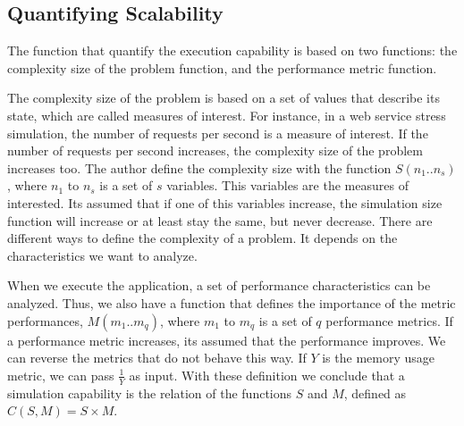 \subsection{Quantifying Scalability}
\label{quantifyingScalability}

The function that quantify the execution capability is based on two functions: the complexity size of the problem function, and the performance metric function. 

The complexity size of the problem is based on a set of values that describe its state, which are called measures of interest. For instance, in a web service stress simulation, the number of requests per second is a measure of interest. If the number of requests per second increases, the complexity size of the problem increases too. The author define the complexity size with the function $S(n_{1}..n_{s})$, where $n_{1}$ to $n_{s}$ is a set of $s$ variables. This variables are the measures of interested. Its assumed that if one of this variables increase, the simulation size function will increase or at least stay the same, but never decrease. There are different ways to define the complexity of a problem. It depends on the characteristics we want to analyze.



When we execute the application, a set of performance characteristics can be analyzed. Thus, we also have a function that defines the importance of the metric performances, $M(m_{1}..m_{q})$, where $m_{1}$ to $m_{q}$ is a set of $q$ performance metrics. If a performance metric increases, its assumed that the performance improves. We can reverse the metrics that do not behave this way. If $Y$ is the memory usage metric, we can pass $\frac{1}{Y}$ as input. With these definition we conclude that a simulation capability is the relation of the functions $S$ and $M$, defined as $C(S,M) = S \times M$.

